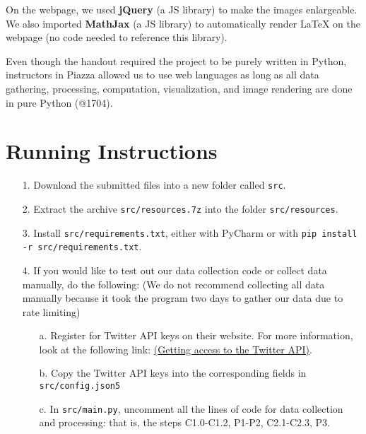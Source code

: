\documentclass{article}
\begin{document}
    On the webpage, we used \textbf{jQuery} (a JS library) to make the images enlargeable. We also imported \textbf{MathJax} (a JS library) to automatically render LaTeX on the webpage (no code needed to reference this library).

    Even though the handout required the project to be purely written in Python, instructors in Piazza allowed us to use web languages as long as all data gathering, processing, computation, visualization, and image rendering are done in pure Python (@1704).

    \section{Running Instructions}
    \indent

    \begin{itemize}
        \item [1. ] Download the submitted files into a new folder called \verb|src|.
        
        \item [2. ] Extract the archive \verb|src/resources.7z| into the folder \verb|src/resources|.
        
        \item [3. ] Install \verb|src/requirements.txt|, either with PyCharm or with \texttt{pip install -r src/requirements.txt}.
        
        \item [4. ] If you would like to test out our data collection code or collect data manually, do the following: (We do not recommend collecting all data manually because it took the program two days to gather our data due to rate limiting)
        
        \begin{itemize}
            \item [a. ] Register for Twitter API keys on their website. For more information, look at the following link: \href{https://developer.twitter.com/en/docs/twitter-api/getting-started/getting-access-to-the-twitter-api}{(Getting access to the Twitter API)}.
            \item [b. ] Copy the Twitter API keys into the corresponding fields in \verb|src/config.json5|
            \item [c. ] In \verb|src/main.py|, uncomment all the lines of code for data collection and processing: that is, the steps C1.0-C1.2, P1-P2, C2.1-C2.3, P3.
        \end{itemize}
        

\end{itemize}
\end{document}
